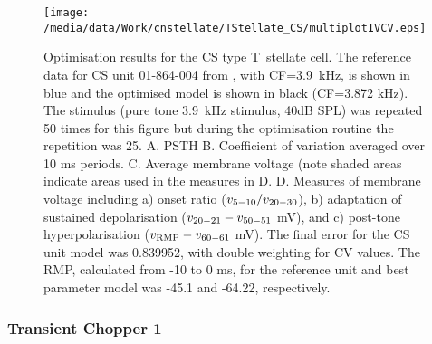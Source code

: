 \begin{figure}[htb]
\centering%
\texttt{[image: /media/data/Work/cnstellate/TStellate\_CS/multiplotIVCV.eps]}
\caption[CS T~stellate Optimisation results]{Optimisation results for the CS type T~stellate cell.
The reference data for CS unit 01-864-004 from  \citep{PaoliniClareyEtAl:2005}, with CF=3.9~kHz, is shown in blue and the     optimised model is shown in black (CF=3.872 kHz).
The stimulus (pure tone  3.9~kHz stimulus, 40dB SPL)  was repeated 50 times for this figure but during the optimisation routine the  repetition was 25.
A. PSTH B. Coefficient of variation averaged over 10 ms periods.
C. Average membrane voltage (note shaded areas indicate areas used in the measures in D.
D. Measures of membrane voltage including a) onset ratio ($v_{\rm 5-10}/v_{\rm 20-30}$), b) adaptation of sustained depolarisation ($v_{\rm 20-21} - v_{\rm 50-51}$ mV), and c) post-tone hyperpolarisation ($v_{\rm RMP} - v_{\rm 60-61}$ mV).
The final error for the CS unit model was 0.839952, with double weighting for CV values.
The RMP, calculated from -10 to 0 ms, for the reference unit and best parameter model was -45.1 and -64.22, respectively.}
\label{fig:CSresults}
\end{figure}



\clearpage
\subsubsection{Transient Chopper 1}

